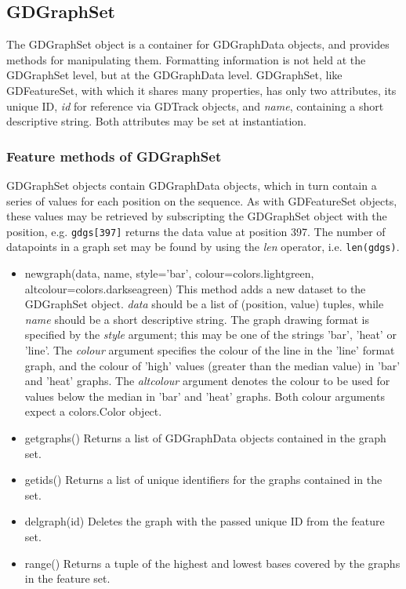 \documentclass{article}
\begin{document}
\subsection{GDGraphSet}
The GDGraphSet object is a container for GDGraphData objects, and provides 
methods for manipulating them.  Formatting information is not held at the 
GDGraphSet level, but at the GDGraphData level.  GDGraphSet, like GDFeatureSet, 
with which it shares many properties, has only two 
attributes, its unique ID, \textit{id} for reference via GDTrack objects, 
and \textit{name}, containing a short descriptive string.  Both 
attributes may be set at instantiation.

\subsubsection{Feature methods of GDGraphSet}
GDGraphSet objects contain GDGraphData objects, which in turn contain a series 
of values for each position on the sequence.  As with GDFeatureSet objects, 
these values may be retrieved by subscripting the GDGraphSet object with the 
position, e.g. \texttt{gdgs[397]} returns the data value at position 397. 
The number of datapoints in a graph set may be found by using the 
\textit{len} operator, i.e. \texttt{len(gdgs)}.

\begin{itemize}
\item {new\us graph(data, name, style='bar', colour=colors.lightgreen,
altcolour=colors.darkseagreen)}
This method adds a new dataset to the GDGraphSet object.  \textit{data} should 
be a list of (position, value) tuples, while \textit{name} should be a short
descriptive string.  The graph drawing format is specified by the 
\textit{style} argument; this may be one of the strings 'bar', 'heat' or 
'line'.  The \textit{colour} argument specifies the colour of the line in the 
'line' format graph, and the colour of 'high' values (greater than the median 
value) in 'bar' and 'heat' graphs.  The \textit{altcolour} argument denotes 
the colour to be used for values below the median in 'bar' and 'heat' graphs.  
Both colour arguments expect a colors.Color object.
\item {get\us graphs()}
Returns a list of GDGraphData objects contained in the graph set.
\item {get\us ids()}
Returns a list of unique identifiers for the graphs contained in the set.
\item {del\us graph(id)}
Deletes the graph with the passed unique ID from the feature set.
\item {range()}
Returns a tuple of the highest and lowest bases covered by the graphs in 
the feature set.
\end{itemize}
\end{document}
